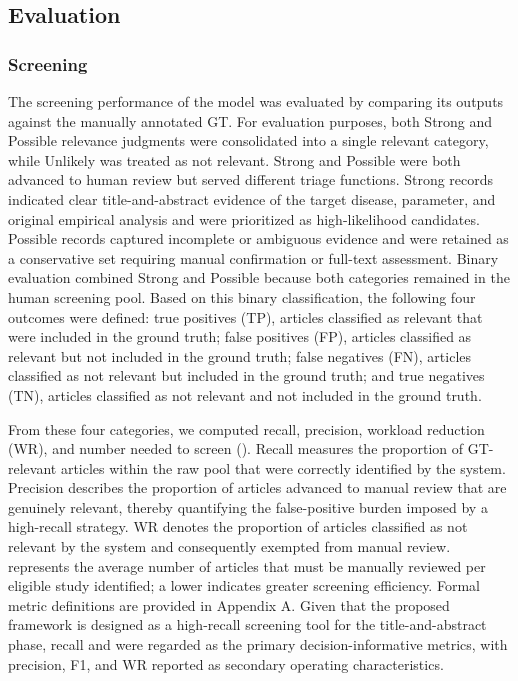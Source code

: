 \subsection{Evaluation}

\subsubsection{Screening}

The screening performance of the model was evaluated by comparing its outputs against the manually annotated GT. For evaluation purposes, both Strong and Possible relevance judgments were consolidated into a single relevant category, while Unlikely was treated as not relevant. Strong and Possible were both advanced to human review but served different triage functions. Strong records indicated clear title-and-abstract evidence of the target disease, parameter, and original empirical analysis and were prioritized as high-likelihood candidates. Possible records captured incomplete or ambiguous evidence and were retained as a conservative set requiring manual confirmation or full-text assessment. Binary evaluation combined Strong and Possible because both categories remained in the human screening pool. Based on this binary classification, the following four outcomes were defined: true positives (TP), articles classified as relevant that were included in the ground truth; false positives (FP), articles classified as relevant but not included in the ground truth; false negatives (FN), articles classified as not relevant but included in the ground truth; and true negatives (TN), articles classified as not relevant and not included in the ground truth.

From these four categories, we computed recall, precision, workload reduction (WR), and number needed to screen (\nns{}). Recall measures the proportion of GT-relevant articles within the raw pool that were correctly identified by the system. Precision describes the proportion of articles advanced to manual review that are genuinely relevant, thereby quantifying the false-positive burden imposed by a high-recall strategy. WR denotes the proportion of articles classified as not relevant by the system and consequently exempted from manual review. \nns{} represents the average number of articles that must be manually reviewed per eligible study identified; a lower \nns{} indicates greater screening efficiency. Formal metric definitions are provided in Appendix A. Given that the proposed framework is designed as a high-recall screening tool for the title-and-abstract phase, recall and \nns{} were regarded as the primary decision-informative metrics, with precision, F1, and WR reported as secondary operating characteristics.

